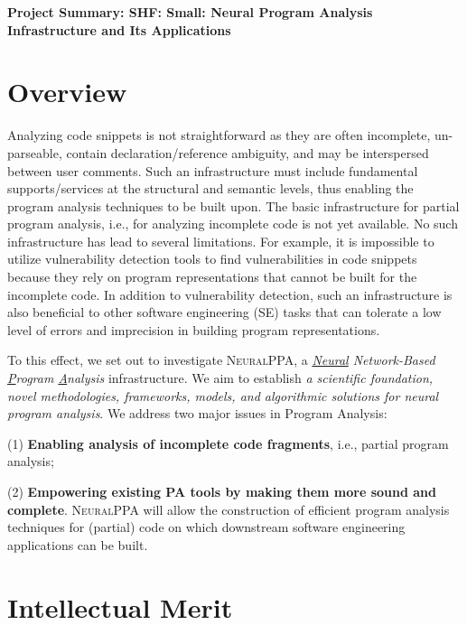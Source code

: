 \documentclass[11pt]{article}
\newcommand{\tool}{\textsc{NeuralPPA}\xspace}
\begin{document}



\begin{center}
  {\bf Project Summary: SHF: Small: Neural Program Analysis Infrastructure and Its Applications}
\end{center}
\vspace{-.1in}



\section{Overview}

Analyzing code snippets is not straightforward as they are often
incomplete, un-parseable, contain declaration/reference ambiguity, and
may be interspersed between user comments. Such an infrastructure must
include fundamental supports/services at the structural and semantic
levels, thus enabling the program analysis techniques to be built
upon. The basic infrastructure for partial program analysis, i.e., for
analyzing incomplete code is not yet available. No such infrastructure
has lead to several limitations. For example, it is impossible to
utilize vulnerability detection tools to find vulnerabilities in code
snippets because they rely on program representations that cannot be
built for the incomplete code. In addition to vulnerability detection,
such an infrastructure is also beneficial to other software
engineering (SE) tasks that can tolerate a low level of errors and
imprecision in building program representations.

To this effect, we set out to investigate {\tool}, a {\em \underline{Neural} Network-Based \underline{P}rogram \underline{A}nalysis} infrastructure. We aim to establish {\em a scientific foundation, novel methodologies, frameworks, models, and algorithmic solutions for neural program analysis}. We address two major issues in Program Analysis:

(1) {\bf Enabling analysis of incomplete code fragments}, i.e.,
partial program analysis;

(2) {\bf Empowering existing PA tools by making them more sound and
  complete}. {\tool} will allow the construction of efficient program
analysis techniques for (partial) code on which downstream software
engineering applications can be built.


\section{Intellectual Merit}
\end{document}
